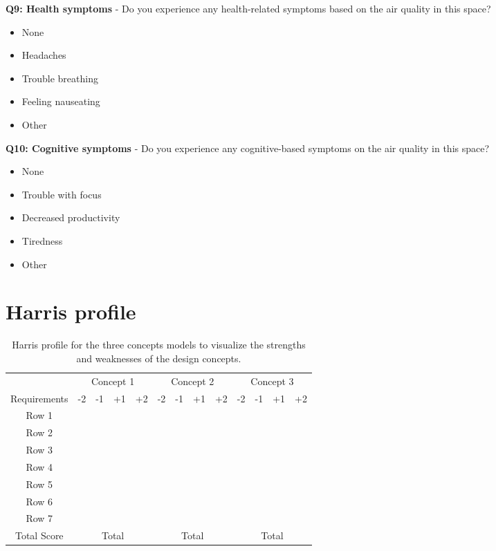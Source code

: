 \begin{appendices}
\textbf{Q9: Health symptoms} - Do you experience any health-related symptoms based on the air quality in this space?

\begin{itemize}
    \item None
    \item Headaches
    \item Trouble breathing
    \item Feeling nauseating
    \item Other
\end{itemize}

\textbf{Q10: Cognitive symptoms} - Do you experience any cognitive-based symptoms on the air quality in this space?

\begin{itemize}
    \item None
    \item Trouble with focus
    \item Decreased productivity
    \item Tiredness
    \item Other
\end{itemize}


\section{Harris profile}
\label{appendix:profile}


\begin{table}[h]
    \centering
    \begin{tabularx}{\textwidth}{|c|*{12}{X|}}
        \hline
        & \multicolumn{4}{c|}{Concept 1} & \multicolumn{4}{c|}{Concept 2} & \multicolumn{4}{c|}{Concept 3} \\
        \cline{2-13}
        Requirements & -2 & -1 & +1 & +2 & -2 & -1 & +1 & +2 & -2 & -1 & +1 & +2 \\
        \hline
        Row 1 & & & & & & & & & & & & \\
        \hline
        Row 2 & & & & & & & & & & & & \\
        \hline
        Row 3 & & & & & & & & & & & & \\
        \hline
        Row 4 & & & & & & & & & & & & \\
        \hline
        Row 5 & & & & & & & & & & & & \\
        \hline
        Row 6 & & & & & & & & & & & & \\
        \hline
        Row 7 & & & & & & & & & & & & \\
        \hline
        Total Score & \multicolumn{4}{c|}{Total} & \multicolumn{4}{c|}{Total} & \multicolumn{4}{c|}{Total} \\
        \hline
    \end{tabularx}
    \caption{Harris profile for the three concepts models to visualize the strengths and weaknesses of the design concepts.}
    \label{tab:requirements_table}
\end{table}


\end{appendices}
